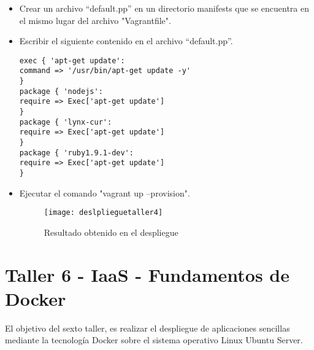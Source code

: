 \documentclass[10pt]{article}   			%
\begin{document}
\begin{itemize}
\item Crear un archivo “default.pp” en un directorio manifests que se encuentra en el mismo lugar del archivo "Vagrantfile".
\item Escribir el siguiente contenido en el archivo “default.pp”.
	
	\begin{small}
	\begin{lstlisting}[frame=single,style=base]	
exec { 'apt-get update':
command => '/usr/bin/apt-get update -y'
}
package { 'nodejs':
require => Exec['apt-get update']
}
package { 'lynx-cur':
require => Exec['apt-get update']
}
package { 'ruby1.9.1-dev':
require => Exec['apt-get update']
}
	\end{lstlisting}
	\end{small}

\item Ejecutar el comando "vagrant up --provision".
\begin{figure}[ht] 
	\centering
		\texttt{[image: deslplieguetaller4]}   
	\caption{Resultado obtenido en el despliegue} \label{fig:deslplieguetaller4}
\end{figure}

\end{itemize}

\newpage %

\section{Taller 6 - IaaS - Fundamentos de Docker}	
	
El objetivo del sexto taller, es realizar el despliegue de aplicaciones sencillas mediante la tecnología Docker sobre el sistema operativo Linux Ubuntu Server.
\end{document}

